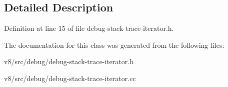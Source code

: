 \subsection{Detailed Description}


Definition at line 15 of file debug-\/stack-\/trace-\/iterator.\+h.



The documentation for this class was generated from the following files\+:\begin{DoxyCompactItemize}
\item 
v8/src/debug/debug-\/stack-\/trace-\/iterator.\+h\item 
v8/src/debug/debug-\/stack-\/trace-\/iterator.\+cc\end{DoxyCompactItemize}
